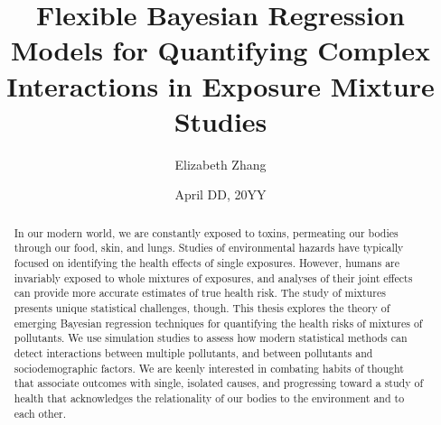 \documentclass[12pt, twoside]{amherstthesis}
\title{Flexible Bayesian Regression Models for Quantifying Complex Interactions in Exposure Mixture Studies}
\author{Elizabeth Zhang}
\date{April DD, 20YY}
\begin{document}
\doublespace
  \maketitle

\frontmatter %
\pagestyle{fancyplain}

  \begin{abstract}
    In our modern world, we are constantly exposed to toxins, permeating our bodies through our food, skin, and lungs. Studies of environmental hazards have typically focused on identifying the health effects of single exposures. However, humans are invariably exposed to whole mixtures of exposures, and analyses of their joint effects can provide more accurate estimates of true health risk. The study of mixtures presents unique statistical challenges, though. This thesis explores the theory of emerging Bayesian regression techniques for quantifying the health risks of mixtures of pollutants. We use simulation studies to assess how modern statistical methods can detect interactions between multiple pollutants, and between pollutants and sociodemographic factors. We are keenly interested in combating habits of thought that associate outcomes with single, isolated causes, and progressing toward a study of health that acknowledges the relationality of our bodies to the environment and to each other.
  \end{abstract}
\end{document}
